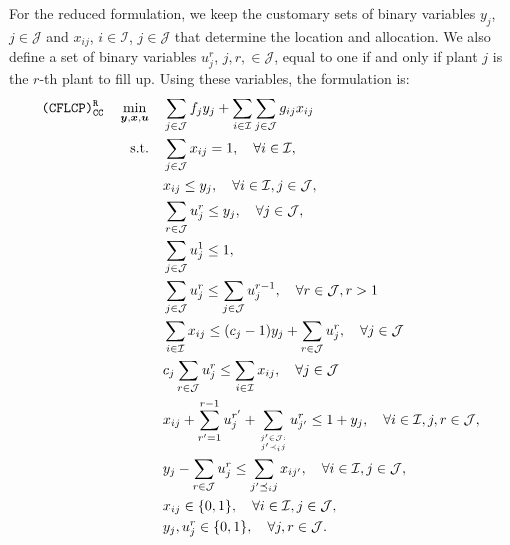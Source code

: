 \documentclass[preprint,11pt,authoryear]{elsarticle}
\def\J{\mathcal{J}}
\def\I{\mathcal{I}}
\begin{document}
For the reduced formulation, we keep the customary sets of binary variables $y_j$, $j\in \J$ and $x_{ij}$, $i\in \I$, $j\in \J$ that determine the location and allocation. We also define a set of binary variables $u_j^r$, $j,r,\in \J$, equal to one if and only if plant $j$ is the $r$-th plant to fill up. Using these variables, the formulation is:
\begin{subequations} \label{CFLCProunds}
\begin{align} 
\texttt{(CFLCP)}_{\texttt{CC}}^{\texttt{R}} \quad \min_{\boldsymbol{y}, \boldsymbol{x}, \boldsymbol{u}} \quad & \sum_{j\in \J} f_jy_j + \sum_{i\in \I} \sum_{j\in \J} g_{ij}x_{ij}  \label{CFLCProunds_OF1} \\
\text{s.t.} \quad & \sum_{j\in \J} x_{ij} = 1, \quad \forall i\in \I, \label{CFLCProunds_allocation} \\
& x_{ij}  \le y_j, \quad \forall i\in \I,j\in\J, \label{CFLCProunds_assignmenttoopenplants}\\
& \sum_{r\in \J} u_j^r \le y_j, \quad \forall j\in\J, \label{CFLCProunds_seagotasiseabre} \\
& \sum_{j\in \J} u_j^1 \le 1, \label{CFLCProunds_seagotaunacadavez1} \\
& \sum_{j\in \J} u_j^r \le \sum_{j\in \J} u^{r-1}_j, \quad \forall r\in\J, r >1  \label{CFLCProunds_seagotaunacadavezresto} \\
&  \sum_{i\in \I} x_{ij} \le (c_j-1)y_j + \sum_{r\in \J} u_j^r, \quad \forall j\in\J  \label{CFLCProunds_uiguala0} \\
& c_j\sum_{r\in \J} u_j^r \le \sum_{i\in \I} x_{ij}, \quad \forall j\in\J  \label{CFLCProunds_uiguala1} \\
&  x_{ij} + \sum_{r'=1}^{r-1} u_j^{r'} + \sum_{j'\in \J:\atop j' \prec_i j} u_{j'}^r \le 1 + y_j, \quad \forall i\in \I,j,r\in\J, \label{CFLCProunds_preferencesFull} \\
&  y_j - \sum_{r\in\J} u_j^r \le \sum_{j' \preceq_i j} x_{ij'}, \quad \forall i\in \I,j\in\J, \label{CFLCProunds_preferencesEmpty} \\
& x_{ij} \in \{0,1\}, \quad \forall i \in \I, j \in \J,  \label{CFLCProunds_xbinarias} \\
& y_j, u_j^r \in \{0,1\}, \quad \forall j,r \in \J.  \label{CFLCProunds_binarias}
\end{align}
\end{subequations}
\end{document}
